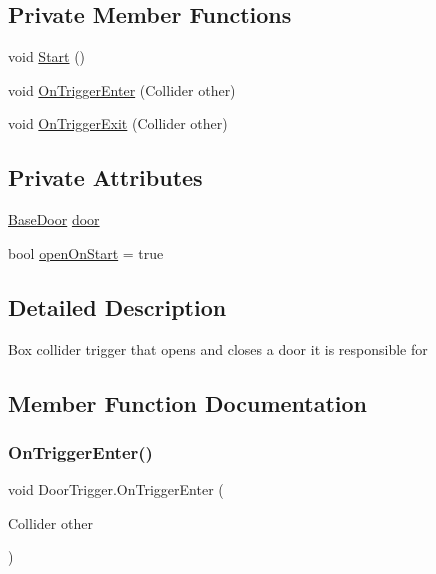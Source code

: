 \subsection*{Private Member Functions}
\begin{DoxyCompactItemize}
\item 
void \mbox{\hyperlink{class_door_trigger_a3b079888a26feb3139b6a0507b89c65c}{Start}} ()
\item 
void \mbox{\hyperlink{class_door_trigger_a9cad842a8527ec462aae682c8c50b118}{On\+Trigger\+Enter}} (Collider other)
\item 
void \mbox{\hyperlink{class_door_trigger_adee54426b691466c5d667b912816bb56}{On\+Trigger\+Exit}} (Collider other)
\end{DoxyCompactItemize}
\subsection*{Private Attributes}
\begin{DoxyCompactItemize}
\item 
\mbox{\hyperlink{class_base_door}{Base\+Door}} \mbox{\hyperlink{class_door_trigger_a592b30ac7c1c4b719d6a90fa96fbb046}{door}}
\item 
bool \mbox{\hyperlink{class_door_trigger_ac3f14399b44bff7efd22f9ce4d4ef5c6}{open\+On\+Start}} = true
\end{DoxyCompactItemize}


\subsection{Detailed Description}
Box collider trigger that opens and closes a door it is responsible for 



\subsection{Member Function Documentation}
\mbox{\label{class_door_trigger_a9cad842a8527ec462aae682c8c50b118}} 
\subsubsection{\texorpdfstring{On\+Trigger\+Enter()}{OnTriggerEnter()}}
{\footnotesize\ttfamily void Door\+Trigger.\+On\+Trigger\+Enter (\begin{DoxyParamCaption}\item[{Collider}]{other }\end{DoxyParamCaption})\hspace{0.3cm}{\ttfamily [private]}}

